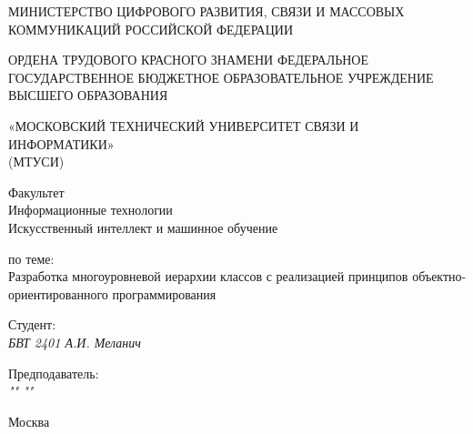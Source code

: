 \thispagestyle{empty}

\begin{center}
    МИНИСТЕРСТВО ЦИФРОВОГО РАЗВИТИЯ, СВЯЗИ И МАССОВЫХ КОММУНИКАЦИЙ РОССИЙСКОЙ ФЕДЕРАЦИИ


    ОРДЕНА ТРУДОВОГО КРАСНОГО ЗНАМЕНИ ФЕДЕРАЛЬНОЕ ГОСУДАРСТВЕННОЕ
БЮДЖЕТНОЕ ОБРАЗОВАТЕЛЬНОЕ УЧРЕЖДЕНИЕ ВЫСШЕГО ОБРАЗОВАНИЯ


    «МОСКОВСКИЙ ТЕХНИЧЕСКИЙ УНИВЕРСИТЕТ СВЯЗИ И ИНФОРМАТИКИ» \\ (МТУСИ)
\end{center}

\vfill

\begin{center}
    Факультет \\
    Информационные технологии \\
    Искусственный интеллект и машинное обучение


    \vspace{20pt}

    по теме: \\
    {Разработка многоуровневой иерархии классов с реализацией принципов объектно-ориентированного программирования}
\end{center}

\vfill

    \noindent Студент: \\
    \textit{БВТ 2401 \hfill А.И. Меланич}

    \vspace{20pt}

    \noindent Предподаватель: \\
    \textit{"" \hfill ""}

\vfill

\begin{center}
    Москва \the\year
\end{center}
